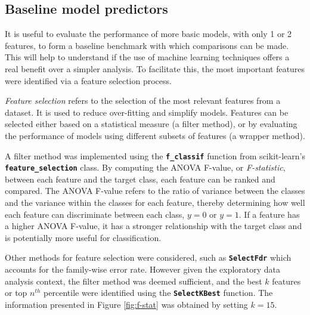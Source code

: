 
\subsection{Baseline model predictors}

\label{feature-selection}

It is useful to evaluate the performance of more basic models, with only 1 or 2 features, to form a baseline benchmark with which comparisons can be made. This will help to understand if the use of machine learning techniques offers a real benefit over a simpler analysis. To facilitate this, the most important features were identified via a feature selection process.

\textit{Feature selection} refers to the selection of the most relevant features from a dataset. It is used to reduce over-fitting and simplify models. Features can be selected either based on a statistical measure (a filter method), or by evaluating the performance of models using different subsets of features (a wrapper method).

A filter method was implemented using the \texttt{\textbf{f\_classif}} function from scikit-learn's \texttt{\textbf{feature\_selection}} class. By computing the ANOVA F-value, or \textit{F-statistic}, between each feature and the target class, each feature can be ranked and compared. The ANOVA F-value refers to the ratio of variance between the classes and the variance within the classes for each feature, thereby determining how well each feature can discriminate between each class, $y=0$ or $y=1$. If a feature has a higher ANOVA F-value, it has a stronger relationship with the target class and is potentially more useful for classification. \label{fclassif}

Other methods for feature selection were considered, such as \texttt{\textbf{SelectFdr}} which accounts for the family-wise error rate. However given the exploratory data analysis context, the filter method was deemed sufficient, and the best $k$ features or top $n^{th}$ percentile were identified using the \texttt{\textbf{SelectKBest}} function. The information presented in Figure \ref{fig:f-stat} was obtained by setting $k = 15$. 
\clearpage

